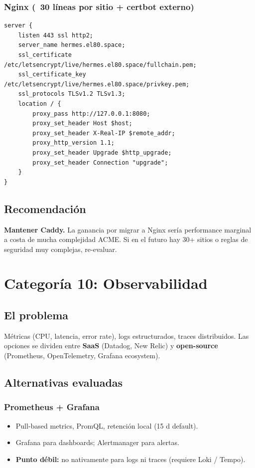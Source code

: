 \documentclass[11pt,a4paper]{article}
\begin{document}
\subsubsection{Nginx (~30 líneas por sitio + certbot externo)}
\begin{lstlisting}[language=bashx]
server {
    listen 443 ssl http2;
    server_name hermes.el80.space;
    ssl_certificate /etc/letsencrypt/live/hermes.el80.space/fullchain.pem;
    ssl_certificate_key /etc/letsencrypt/live/hermes.el80.space/privkey.pem;
    ssl_protocols TLSv1.2 TLSv1.3;
    location / {
        proxy_pass http://127.0.0.1:8080;
        proxy_set_header Host $host;
        proxy_set_header X-Real-IP $remote_addr;
        proxy_http_version 1.1;
        proxy_set_header Upgrade $http_upgrade;
        proxy_set_header Connection "upgrade";
    }
}
\end{lstlisting}

\subsection{Recomendación}

\textbf{Mantener Caddy.} La ganancia por migrar a Nginx sería performance marginal a costa de mucha complejidad ACME. Si en el futuro hay 30+ sitios o reglas de seguridad muy complejas, re-evaluar.

\newpage

\section{Categoría 10: Observabilidad}

\subsection{El problema}

Métricas (CPU, latencia, error rate), logs estructurados, traces distribuidos. Las opciones se dividen entre \textbf{SaaS} (Datadog, New Relic) y \textbf{open-source} (Prometheus, OpenTelemetry, Grafana ecosystem).

\subsection{Alternativas evaluadas}

\subsubsection{Prometheus + Grafana}
\begin{itemize}[leftmargin=*,itemsep=0pt]
\item Pull-based metrics, PromQL, retención local (15 d default).
\item Grafana para dashboards; Alertmanager para alertas.
\item \textbf{Punto débil:} no nativamente para logs ni traces (requiere Loki / Tempo).
\end{itemize}
\end{document}
